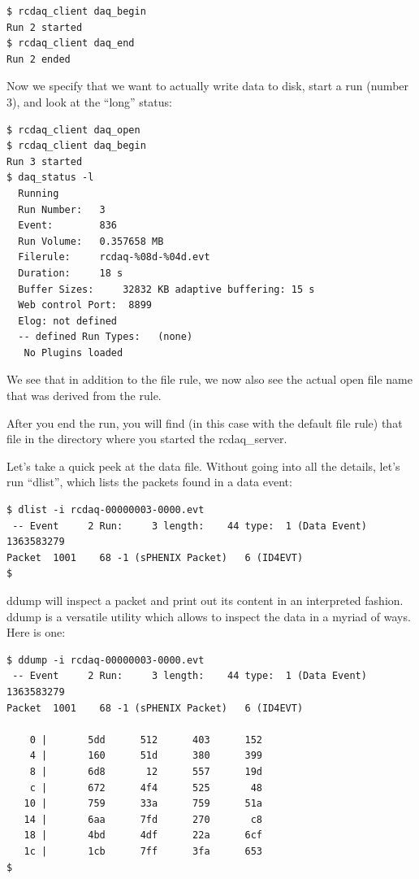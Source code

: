 \documentclass{article}[11pt]
\begin{document}
\begin{verbatim}
$ rcdaq_client daq_begin
Run 2 started
$ rcdaq_client daq_end
Run 2 ended
\end{verbatim}

Now we specify that we want to actually write data to disk, start a
run (number 3), and look at the ``long'' status:

\begin{verbatim}
$ rcdaq_client daq_open
$ rcdaq_client daq_begin
Run 3 started
$ daq_status -l
  Running
  Run Number:   3
  Event:        836
  Run Volume:   0.357658 MB
  Filerule:     rcdaq-%08d-%04d.evt
  Duration:     18 s
  Buffer Sizes:     32832 KB adaptive buffering: 15 s
  Web control Port:  8899
  Elog: not defined
  -- defined Run Types:   (none)
   No Plugins loaded
\end{verbatim}

We see that in addition to the file rule, we now also see the actual
open file name that was derived from the rule.

After you end the run, you will find (in this case with the default
file rule) that file in the directory where you started the
rcdaq\_server.

Let's take a quick peek at the data file. Without going into all the
details, let's run ``dlist'', which lists the packets found in a data
event:

\begin{verbatim}
$ dlist -i rcdaq-00000003-0000.evt 
 -- Event     2 Run:     3 length:    44 type:  1 (Data Event)  1363583279
Packet  1001    68 -1 (sPHENIX Packet)   6 (ID4EVT)
$
\end{verbatim}

ddump will inspect a packet and print out its content in an
interpreted fashion. ddump is a versatile utility which allows to
inspect the data in a myriad of ways. Here is one:

\begin{verbatim}
$ ddump -i rcdaq-00000003-0000.evt
 -- Event     2 Run:     3 length:    44 type:  1 (Data Event)  1363583279
Packet  1001    68 -1 (sPHENIX Packet)   6 (ID4EVT)

    0 |       5dd      512      403      152 
    4 |       160      51d      380      399 
    8 |       6d8       12      557      19d 
    c |       672      4f4      525       48 
   10 |       759      33a      759      51a 
   14 |       6aa      7fd      270       c8 
   18 |       4bd      4df      22a      6cf 
   1c |       1cb      7ff      3fa      653 
$ 
\end{verbatim}
\end{document}
